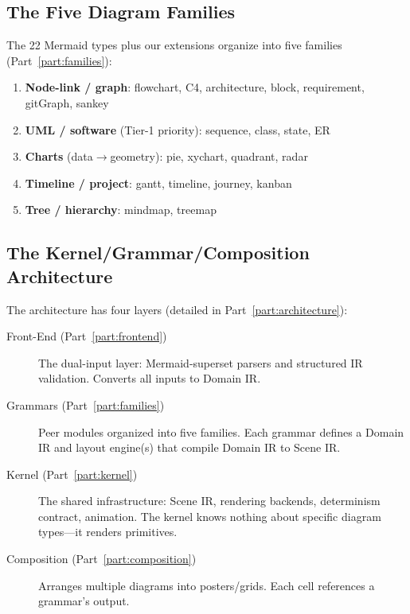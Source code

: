 \subsection{The Five Diagram Families}

The 22 Mermaid types plus our extensions organize into five families
(Part~\ref{part:families}):

\begin{enumerate}
  \item \textbf{Node-link / graph}: flowchart, C4, architecture, block, requirement,
        gitGraph, sankey
  \item \textbf{UML / software} (Tier-1 priority): sequence, class, state, ER
  \item \textbf{Charts} (data$\to$geometry): pie, xychart, quadrant, radar
  \item \textbf{Timeline / project}: gantt, timeline, journey, kanban
  \item \textbf{Tree / hierarchy}: mindmap, treemap
\end{enumerate}

\subsection{The Kernel/Grammar/Composition Architecture}

The architecture has four layers (detailed in Part~\ref{part:architecture}):

\begin{description}
  \item[Front-End (Part~\ref{part:frontend})] The dual-input layer: Mermaid-superset parsers
        and structured IR validation. Converts all inputs to Domain IR.

  \item[Grammars (Part~\ref{part:families})] Peer modules organized into five families.
        Each grammar defines a Domain IR and layout engine(s) that compile Domain IR to Scene IR.

  \item[Kernel (Part~\ref{part:kernel})] The shared infrastructure: Scene IR, rendering
        backends, determinism contract, animation. The kernel knows nothing about specific
        diagram types---it renders primitives.

  \item[Composition (Part~\ref{part:composition})] Arranges multiple diagrams into
        posters/grids. Each cell references a grammar's output.
\end{description}

